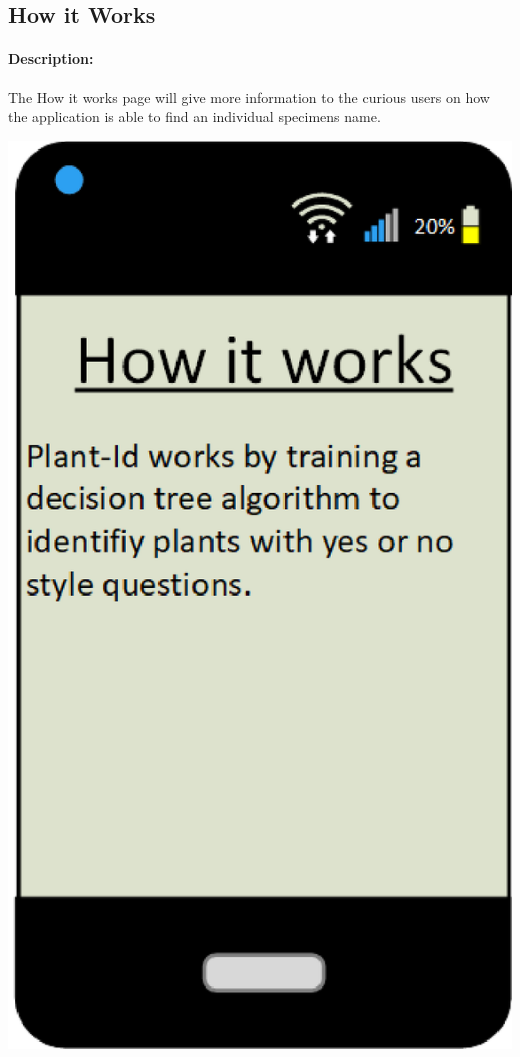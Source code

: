 \documentclass[a4paper]{article}
\begin{document}
\subsection{How it Works}
\paragraph{Description:} The How it works page will give more information to the curious users on how the application is able to find an individual specimens name.
\begin{center}\includegraphics[scale=.8]{HowItWorks.eps}\end{center}
\pagebreak
\end{document}
